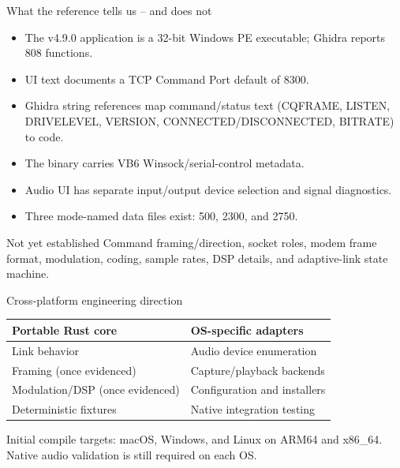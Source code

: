 \documentclass[20pt]{beamer}
\begin{document}
\begin{frame}{What the reference tells us -- and does not}
  \begin{itemize}
    \item The v4.9.0 application is a 32-bit Windows PE executable; Ghidra
          reports 808 functions.
    \item UI text documents a TCP Command Port default of 8300.
    \item Ghidra string references map command/status text (CQFRAME, LISTEN,
          DRIVELEVEL, VERSION, CONNECTED/DISCONNECTED, BITRATE) to code.
    \item The binary carries VB6 Winsock/serial-control metadata.
    \item Audio UI has separate input/output device selection and signal
          diagnostics.
    \item Three mode-named data files exist: 500, 2300, and 2750.
  \end{itemize}
  \begin{alertblock}{Not yet established}
    Command framing/direction, socket roles, modem frame format, modulation,
    coding, sample rates, DSP details, and adaptive-link state machine.
  \end{alertblock}
\end{frame}

\begin{frame}{Cross-platform engineering direction}
  \centering
  \begin{tabular}{ll}
    \toprule
    \textbf{Portable Rust core} & \textbf{OS-specific adapters} \\
    \midrule
    Link behavior & Audio device enumeration \\
    Framing (once evidenced) & Capture/playback backends \\
    Modulation/DSP (once evidenced) & Configuration and installers \\
    Deterministic fixtures & Native integration testing \\
    \bottomrule
  \end{tabular}
  \vspace{1em}

  Initial compile targets: macOS, Windows, and Linux on ARM64 and x86\_64.
  Native audio validation is still required on each OS.
\end{frame}
\end{document}
